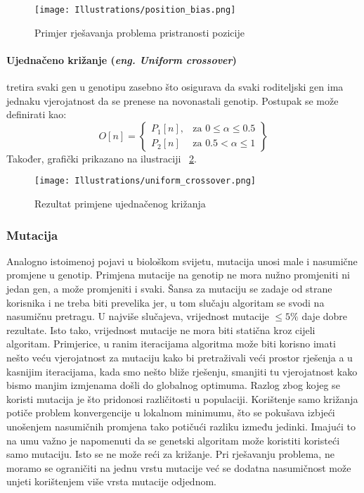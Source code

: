 \begin{figure}
	\texttt{[image: Illustrations/position\_bias.png]}
	\caption{Primjer rješavanja problema pristranosti pozicije}
	\label{fig:position_bias}
\end{figure}

\paragraph{Ujednačeno križanje (\emph{eng. Uniform crossover})}
tretira svaki gen u genotipu zasebno što osigurava da svaki roditeljski gen ima jednaku vjerojatnost da se prenese na novonastali genotip.
Postupak se može definirati kao:
\[
	O[n] = \left\{\begin{array}{lr}
			P_1[n], & \text{za } 0 \leq \alpha \leq 0.5 \\
			P_2[n] & \text{za } 0.5 < \alpha \leq 1
		\end{array}\right\}
\]
Također, grafički prikazano na ilustraciji ~\ref{fig:uniform_crossover}.

\begin{figure}
	\texttt{[image: Illustrations/uniform\_crossover.png]}
	\caption{Rezultat primjene ujednačenog križanja}
	\label{fig:uniform_crossover}
\end{figure}

\subsubsection{Mutacija}
Analogno istoimenoj pojavi u biološkom svijetu, mutacija unosi male i nasumične promjene u genotip.
Primjena mutacije na genotip ne mora nužno promjeniti ni jedan gen, a može promjeniti i svaki.
Šansa za mutaciju se zadaje od strane korisnika i ne treba biti prevelika jer, u tom slučaju algoritam se svodi na nasumičnu pretragu.
U najviše slučajeva, vrijednost mutacije $\leq 5\%$ daje dobre rezultate.
Isto tako, vrijednost mutacije ne mora biti statična kroz cijeli algoritam.
Primjerice, u ranim iteracijama algoritma može biti korisno imati nešto veću vjerojatnost za mutaciju kako bi pretraživali veći prostor rješenja a u kasnijim iteracijama, kada smo nešto bliže rješenju, smanjiti tu vjerojatnost kako bismo manjim izmjenama došli do globalnog optimuma.
Razlog zbog kojeg se koristi mutacija je što pridonosi različitosti u populaciji.
Korištenje samo križanja potiče problem konvergencije u lokalnom minimumu, što se pokušava izbjeći unošenjem nasumičnih promjena tako potičući razliku između jedinki.
Imajući to na umu važno je napomenuti da se genetski algoritam može koristiti koristeći samo mutaciju.
Isto se ne može reći za križanje.
Pri rješavanju problema, ne moramo se ograničiti na jednu vrstu mutacije već se dodatna nasumičnost može unjeti korištenjem više vrsta mutacije odjednom.

